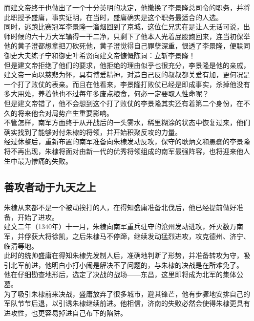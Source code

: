 \begin{multicols}{\theparacolNo}
而建文帝终于也做出了一个十分英明的决定，他撤换了李景隆总司令的职务，并将此职授予盛庸，事实证明，在当时，盛庸确实是这个职务最适合的人选。\\

同时，逃跑比赛冠军李景隆一溜烟回到了京城，这位仁兄实在是让人无话可说，出师时候的六十万大军输得一干二净，只剩下了他本人光着屁股跑回来，连当初保举他的黄子澄都想拿把刀砍死他，黄子澄觉得自己罪孽深重，恨透了李景隆，便联同御史大夫练子宁和御史叶希贤向建文帝慷慨陈词：立斩李景隆！\\

但是建文帝拒绝了他们的要求，他拒绝的理由似乎也很充分，李景隆是他的亲戚，建文帝一向以慈悲为怀，具有博爱精神，对造自己反的叔叔都关爱有加，更何况是一个打了败仗的表亲。而且在他看来，李景隆打败仗已经是即成事实，杀掉他没有多大用处，养着他也不过每年多废点粮食，何必一定要取人性命呢？\\

但是建文帝错了，他不会想到这个打了败仗的李景隆其实还有着第二个身份，在不久的将来他会对局势产生重要影响。\\

不管怎样，南军方面终于从开战后的一头雾水，稀里糊涂的状态中恢复过来，他们确实找到了能够对付朱棣的将领，并开始积聚反攻的力量。\\

经过休整后，重新布置的南军准备向朱棣发动反攻，保守的耿炳文和愚蠢的李景隆将不再出现，朱棣将面对由新一代的优秀将领组成的南军最强阵容，也将迎来他人生中最为惨痛的失败。\\

\subsection{善攻者动于九天之上}
朱棣从来都不是一个被动挨打的人，在得知盛庸准备北伐后，他已经提前做好准备，开始了进攻。\\

建文二年（1340年）十一月，朱棣向南军重兵驻守的沧州发动进攻，歼灭数万南军，并俘获大将徐凯，之后朱棣马不停蹄，继续发动猛烈进攻，攻克德州、济宁、临清等地。\\

此时的统帅盛庸在得知朱棣先发制人后，准确地判断了形势，并准备转攻为守，吸引北军前进，他明白小打小闹是解决不了问题的，与朱棣的决战是在所难免了。\\

他在仔细勘查地形后，选定了决战的战场——东昌，这里即将成为北军的集体公墓。\\

为了吸引朱棣前来决战，盛庸放弃了很多城市，避其锋芒，他有步骤地安排自己的军队节节后退，以引诱朱棣继续前进。他相信，济南的失败必然会使得朱棣更具有进攻性，也更容易掉进自己布下的陷阱。\\


\end{multicols}
